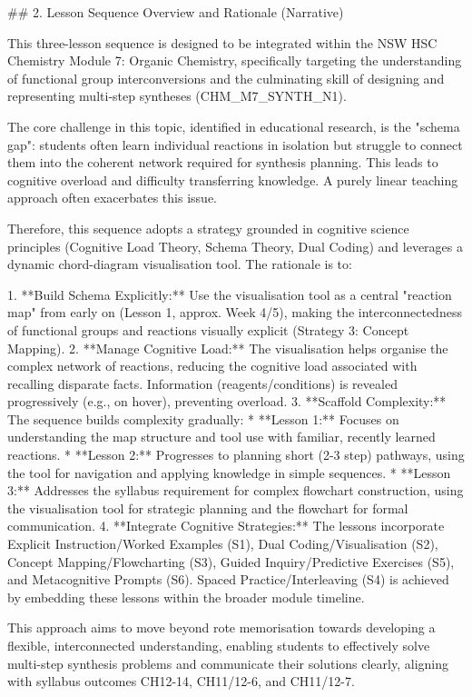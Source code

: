 ## 2. Lesson Sequence Overview and Rationale (Narrative)


This three-lesson sequence is designed to be integrated within the NSW HSC Chemistry Module 7: Organic Chemistry, specifically targeting the understanding of functional group interconversions and the culminating skill of designing and representing multi-step syntheses (CHM\_M7\_SYNTH\_N1).

The core challenge in this topic, identified in educational research, is the "schema gap": students often learn individual reactions in isolation but struggle to connect them into the coherent network required for synthesis planning. This leads to cognitive overload and difficulty transferring knowledge. A purely linear teaching approach often exacerbates this issue.

Therefore, this sequence adopts a strategy grounded in cognitive science principles (Cognitive Load Theory, Schema Theory, Dual Coding) and leverages a dynamic chord-diagram visualisation tool. The rationale is to:

1.  **Build Schema Explicitly:** Use the visualisation tool as a central "reaction map" from early on (Lesson 1, approx. Week 4/5), making the interconnectedness of functional groups and reactions visually explicit (Strategy 3: Concept Mapping).
2.  **Manage Cognitive Load:** The visualisation helps organise the complex network of reactions, reducing the cognitive load associated with recalling disparate facts. Information (reagents/conditions) is revealed progressively (e.g., on hover), preventing overload.
3.  **Scaffold Complexity:** The sequence builds complexity gradually:
    *   **Lesson 1:** Focuses on understanding the map structure and tool use with familiar, recently learned reactions.
    *   **Lesson 2:** Progresses to planning short (2-3 step) pathways, using the tool for navigation and applying knowledge in simple sequences.
    *   **Lesson 3:** Addresses the syllabus requirement for complex flowchart construction, using the visualisation tool for strategic planning and the flowchart for formal communication.
4.  **Integrate Cognitive Strategies:** The lessons incorporate Explicit Instruction/Worked Examples (S1), Dual Coding/Visualisation (S2), Concept Mapping/Flowcharting (S3), Guided Inquiry/Predictive Exercises (S5), and Metacognitive Prompts (S6). Spaced Practice/Interleaving (S4) is achieved by embedding these lessons within the broader module timeline.

This approach aims to move beyond rote memorisation towards developing a flexible, interconnected understanding, enabling students to effectively solve multi-step synthesis problems and communicate their solutions clearly, aligning with syllabus outcomes CH12-14, CH11/12-6, and CH11/12-7.
